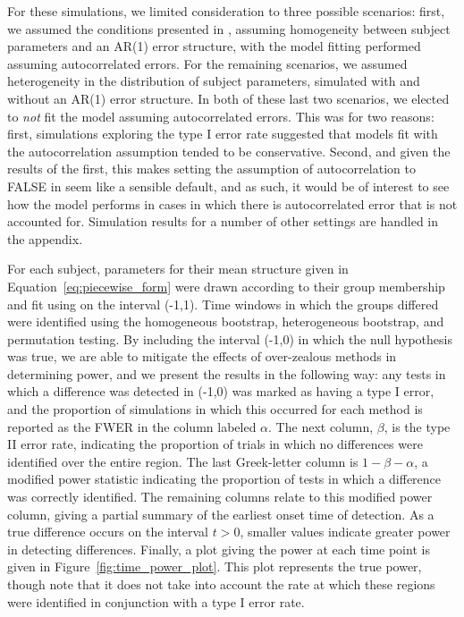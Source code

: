 For these simulations, we limited consideration to three possible scenarios: first, we assumed the conditions presented in \citet{oleson2017detecting}, assuming homogeneity between subject parameters and an AR(1) error structure, with the model fitting performed assuming autocorrelated errors. For the remaining scenarios, we assumed heterogeneity in the distribution of subject parameters, simulated with and without an AR(1) error structure. In both of these last two scenarios, we elected to \textit{not} fit the model assuming autocorrelated errors. This was for two reasons: first, simulations exploring the type I error rate suggested that models fit with the autocorrelation assumption tended to be conservative. Second, and given the results of the first, this makes setting the assumption of autocorrelation to FALSE in  seem like a sensible default, and as such, it would be of interest to see how the model performs in cases in which there is autocorrelated error that is not accounted for. Simulation results for a number of other settings are handled in the appendix. 

For each subject, parameters for their mean structure given in Equation~\ref{eq:piecewise_form} were drawn according to their group membership and fit using  on the interval (-1,1). Time windows in which the groups differed were identified using the homogeneous bootstrap, heterogeneous bootstrap, and permutation testing. By including the interval (-1,0) in which the null hypothesis was true, we are able to mitigate the effects of over-zealous methods in determining power, and we present the results in the following way: any tests in which a difference was detected in (-1,0) was marked as having a type I error, and the proportion of simulations in which this occurred for each method is reported as the FWER in the column labeled $\alpha$. The next column, $\beta$, is the type II error rate, indicating the proportion of trials in which no differences were identified over the entire region. The last Greek-letter column is $1 - \beta - \alpha$, a modified power statistic indicating the proportion of tests in which a difference was correctly identified. The remaining columns relate to this modified power column, giving a partial summary of the earliest onset time of detection. As a true difference occurs on the interval $t > 0$, smaller values indicate greater power in detecting differences. Finally, a plot giving the power at each time point is given in Figure~\ref{fig:time_power_plot}. This plot represents the true power, though note that it does not take into account the rate at which these regions were identified in conjunction with a type I error rate. 


